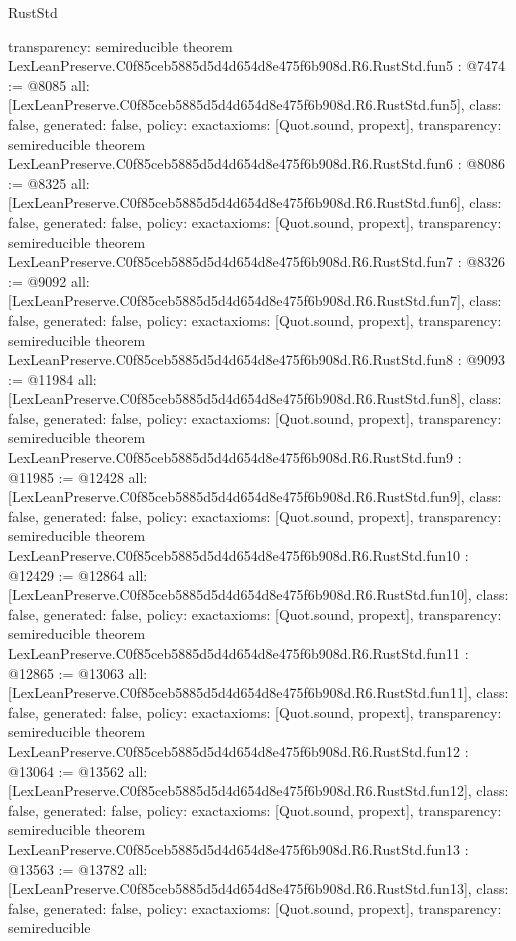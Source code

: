 \begin{lexlean}{RustStd}
\begin{coremodule}
{  transparency: semireducible
}
theorem LexLeanPreserve.C0f85ceb5885d5d4d654d8e475f6b908d.R6.RustStd.fun5 : @7474 := @8085 {
  all: [LexLeanPreserve.C0f85ceb5885d5d4d654d8e475f6b908d.R6.RustStd.fun5],
  class: false,
  generated: false,
  policy: exact{axioms: [Quot.sound, propext]},
  transparency: semireducible
}
theorem LexLeanPreserve.C0f85ceb5885d5d4d654d8e475f6b908d.R6.RustStd.fun6 : @8086 := @8325 {
  all: [LexLeanPreserve.C0f85ceb5885d5d4d654d8e475f6b908d.R6.RustStd.fun6],
  class: false,
  generated: false,
  policy: exact{axioms: [Quot.sound, propext]},
  transparency: semireducible
}
theorem LexLeanPreserve.C0f85ceb5885d5d4d654d8e475f6b908d.R6.RustStd.fun7 : @8326 := @9092 {
  all: [LexLeanPreserve.C0f85ceb5885d5d4d654d8e475f6b908d.R6.RustStd.fun7],
  class: false,
  generated: false,
  policy: exact{axioms: [Quot.sound, propext]},
  transparency: semireducible
}
theorem LexLeanPreserve.C0f85ceb5885d5d4d654d8e475f6b908d.R6.RustStd.fun8 : @9093 := @11984 {
  all: [LexLeanPreserve.C0f85ceb5885d5d4d654d8e475f6b908d.R6.RustStd.fun8],
  class: false,
  generated: false,
  policy: exact{axioms: [Quot.sound, propext]},
  transparency: semireducible
}
theorem LexLeanPreserve.C0f85ceb5885d5d4d654d8e475f6b908d.R6.RustStd.fun9 : @11985 := @12428 {
  all: [LexLeanPreserve.C0f85ceb5885d5d4d654d8e475f6b908d.R6.RustStd.fun9],
  class: false,
  generated: false,
  policy: exact{axioms: [Quot.sound, propext]},
  transparency: semireducible
}
theorem LexLeanPreserve.C0f85ceb5885d5d4d654d8e475f6b908d.R6.RustStd.fun10 : @12429 := @12864 {
  all: [LexLeanPreserve.C0f85ceb5885d5d4d654d8e475f6b908d.R6.RustStd.fun10],
  class: false,
  generated: false,
  policy: exact{axioms: [Quot.sound, propext]},
  transparency: semireducible
}
theorem LexLeanPreserve.C0f85ceb5885d5d4d654d8e475f6b908d.R6.RustStd.fun11 : @12865 := @13063 {
  all: [LexLeanPreserve.C0f85ceb5885d5d4d654d8e475f6b908d.R6.RustStd.fun11],
  class: false,
  generated: false,
  policy: exact{axioms: [Quot.sound, propext]},
  transparency: semireducible
}
theorem LexLeanPreserve.C0f85ceb5885d5d4d654d8e475f6b908d.R6.RustStd.fun12 : @13064 := @13562 {
  all: [LexLeanPreserve.C0f85ceb5885d5d4d654d8e475f6b908d.R6.RustStd.fun12],
  class: false,
  generated: false,
  policy: exact{axioms: [Quot.sound, propext]},
  transparency: semireducible
}
theorem LexLeanPreserve.C0f85ceb5885d5d4d654d8e475f6b908d.R6.RustStd.fun13 : @13563 := @13782 {
  all: [LexLeanPreserve.C0f85ceb5885d5d4d654d8e475f6b908d.R6.RustStd.fun13],
  class: false,
  generated: false,
  policy: exact{axioms: [Quot.sound, propext]},
  transparency: semireducible
}
\end{coremodule}
\end{lexlean}
